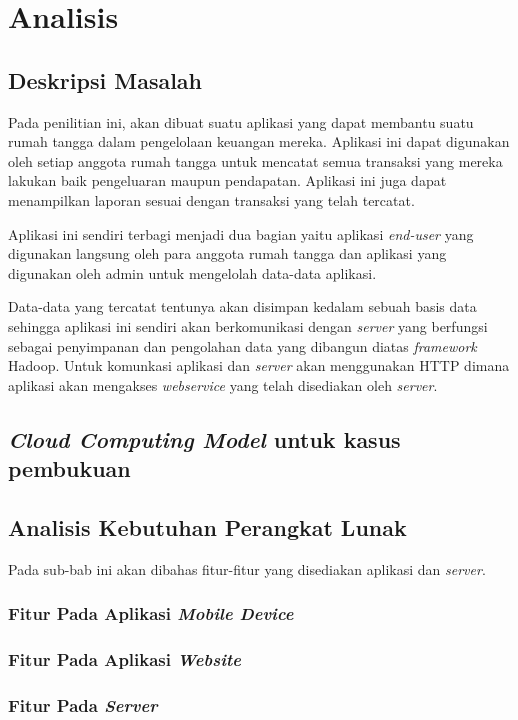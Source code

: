\chapter{Analisis}
\label{chap:analisis}

\section{Deskripsi Masalah}
\label{sec:deskripsimasalah}

Pada penilitian ini, akan dibuat suatu aplikasi yang dapat membantu suatu rumah tangga dalam pengelolaan keuangan mereka. Aplikasi ini dapat digunakan oleh setiap anggota rumah tangga untuk mencatat semua transaksi yang mereka lakukan baik pengeluaran maupun pendapatan. Aplikasi ini juga dapat menampilkan laporan sesuai dengan transaksi yang telah tercatat.

Aplikasi ini sendiri terbagi menjadi dua bagian yaitu aplikasi \textit{end-user} yang digunakan langsung oleh para anggota rumah tangga dan aplikasi yang digunakan oleh admin untuk mengelolah data-data aplikasi.

Data-data yang tercatat tentunya akan disimpan kedalam sebuah basis data sehingga aplikasi ini sendiri akan berkomunikasi dengan \textit{server} yang berfungsi sebagai penyimpanan dan pengolahan data yang dibangun diatas \textit{framework} Hadoop. Untuk komunkasi aplikasi dan \textit{server} akan menggunakan HTTP dimana aplikasi akan mengakses \textit{webservice} yang telah disediakan oleh \textit{server}.

\section{\textit{Cloud Computing Model} untuk kasus pembukuan}

\section{Analisis Kebutuhan Perangkat Lunak}

Pada sub-bab ini akan dibahas fitur-fitur yang disediakan aplikasi dan \textit{server}.

\subsection{Fitur Pada Aplikasi \textit{Mobile Device}}
\subsection{Fitur Pada Aplikasi \textit{Website}}
\subsection{Fitur Pada \textit{Server}}